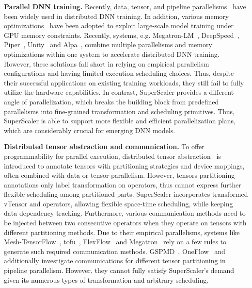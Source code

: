 
{\bf  Parallel DNN training. } Recently, data, tensor, and pipeline parallelisms~\cite{data-parallel, zero, gpipe, dapple, chimera} have been widely used in distributed DNN training. In addition, various memory optimizations~\cite{DTR, recompute, huang2020swapadvisor} have been adopted to exploit large-scale model training under GPU memory constraints. Recently, systems, e.g. Megatron-LM~\cite{megatron1,megatron2,megatron3}, DeepSpeed~\cite{deepspeed}, Piper~\cite{piper}, Unity~\cite{unity} and Alpa~\cite{alpa}, combine multiple parallelisms and memory optimizations within one system to accelerate distributed DNN training. However, these solutions fall short in relying on  empirical parallelism configurations and having limited execution scheduling choices. Thus, despite their successful applications on existing training workloads, they still fail to fully utilize the hardware capabilities. In contrast, {SuperScaler} provides a different angle of parallelization, which breaks the building block from predefined parallelisms into fine-grained transformation and scheduling primitives. Thus, {SuperScaler} is able to support more flexible and efficient  parallelization plans, which are considerably crucial for emerging DNN models.

{\bf  Distributed tensor abstraction and communication. } To offer programmability for parallel execution, distributed tensor abstraction~\cite{pytorch-dtensor, tf-dtensor, oneflow} is introduced to annotate tensors with partitioning strategies and device mappings, often combined with data or tensor parallelism. However, tensors partitioning annotations only label transformation on operators, thus cannot express further flexible scheduling among partitioned parts. {SuperScaler} incorporates transformed vTensor and operators, allowing flexible space-time scheduling, while keeping data dependency tracking. Furthermore, various communication methods need to be injected between two consecutive operators when they operate on tensors with different partitioning methods. Due to their empirical parallelisms, systems like Mesh-TensorFlow~\cite{tensorflow-mesh}, tofu~\cite{tofu}, FlexFlow~\cite{flexflow} and Megatron~\cite{megatron2} rely on a few rules to generate such required communication methods. GSPMD~\cite{gspmd}, OneFlow~\cite{oneflow} and~\cite{array-redist,pipeline-comm} additionally  investigate communications for different tensor partitioning in pipeline parallelism. However, they cannot fully satisfy {SuperScaler}'s demand given its numerous types of transformation and arbitrary scheduling. 

